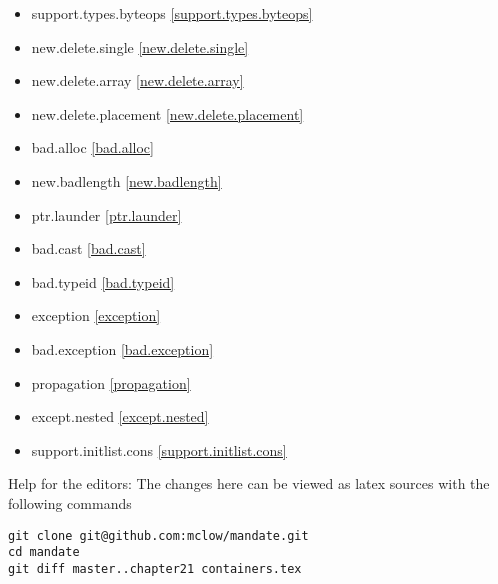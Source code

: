 \begin{itemize}
\item{support.types.byteops  \ref{support.types.byteops}}
\item{new.delete.single      \ref{new.delete.single}}
\item{new.delete.array       \ref{new.delete.array}}
\item{new.delete.placement   \ref{new.delete.placement}}
\item{bad.alloc              \ref{bad.alloc}}
\item{new.badlength          \ref{new.badlength}}
\item{ptr.launder            \ref{ptr.launder}}
\item{bad.cast               \ref{bad.cast}}
\item{bad.typeid             \ref{bad.typeid}}
\item{exception              \ref{exception}}
\item{bad.exception          \ref{bad.exception}}
\item{propagation            \ref{propagation}}
\item{except.nested          \ref{except.nested}}
\item{support.initlist.cons  \ref{support.initlist.cons}}
\end{itemize}

\vfill
Help for the editors: The changes here can be viewed as latex sources with the following commands
\begin{verbatim}
git clone git@github.com:mclow/mandate.git
cd mandate
git diff master..chapter21 containers.tex
\end{verbatim}
\newpage
